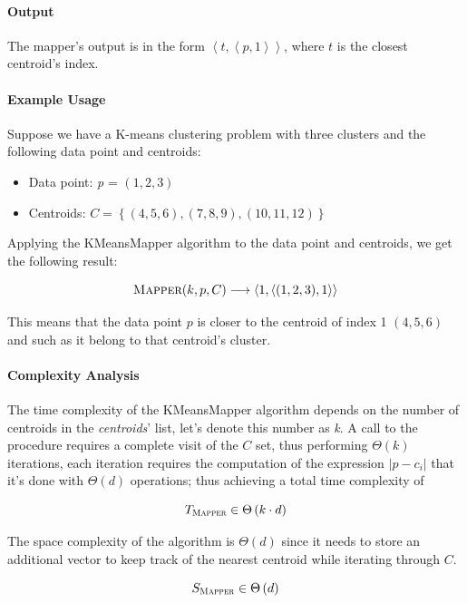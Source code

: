\documentclass[parskip=full]{report}
\begin{document}
\paragraph{Output}
The mapper's output is in the form $\left\langle t, \left\langle 
p,1\right\rangle \right\rangle$, where $t$ is the closest centroid's index.

\paragraph{Example Usage}
Suppose we have a K-means clustering problem with three clusters and the following data point and centroids:

\begin{itemize}
	\item	Data point: \textit{p} = $(1, 2, 3)$
	
	\item Centroids: $C =\left\{(4,5,6), (7, 8, 9), (10, 11, 12)\right\} $
\end{itemize}

Applying the KMeansMapper algorithm to the data point and centroids, we get the following result:

\[
\textsc{Mapper}(k, p, C) \longrightarrow
\left\langle 1, \left\langle (1, 2, 3),1\right\rangle \right\rangle
\]

This means that the data point $p$ is closer to the centroid of index 1 $(4, 5, 
6)$ and such as it belong to that centroid's cluster.

\paragraph{Complexity Analysis}
The time complexity of the KMeansMapper algorithm depends on the number of 
centroids in the \textit{centroids}' list, let's denote this number as 
\textit{k}.
A call to the procedure requires a complete visit of the $C$ set, thus 
performing $\Theta(k)$ iterations, each iteration requires the computation of 
the expression $|p - c_i|$ that it's done with $\Theta(d)$ operations; thus 
achieving a total time complexity of

\[
T_\textsc{Mapper} \in \Theta \left(k \cdot d\right)
\]

The space complexity of the algorithm is $\Theta(d)$ since it needs to store an 
additional vector to keep track of the nearest centroid while iterating through 
$C$.

\[
S_\textsc{Mapper} \in \Theta \left(d\right)
\]
\end{document}
